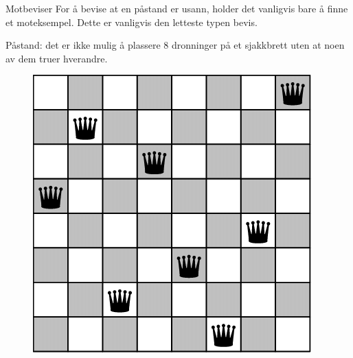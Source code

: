 \begin{frame}{Motbeviser}
    For å bevise at en påstand er usann, holder det vanligvis bare å finne et moteksempel. Dette er vanligvis den letteste typen bevis.
    
    \pause
    \begin{block}{Påstand: det er ikke mulig å plassere 8 dronninger på et sjakkbrett uten at noen av dem truer hverandre.}
    \pause
    \begin{figure}
        \centering
        \includegraphics[scale=0.20]{8 queens.png}
        \label{fig:my_label}
    \end{figure}
    
    \end{block}
\end{frame}

